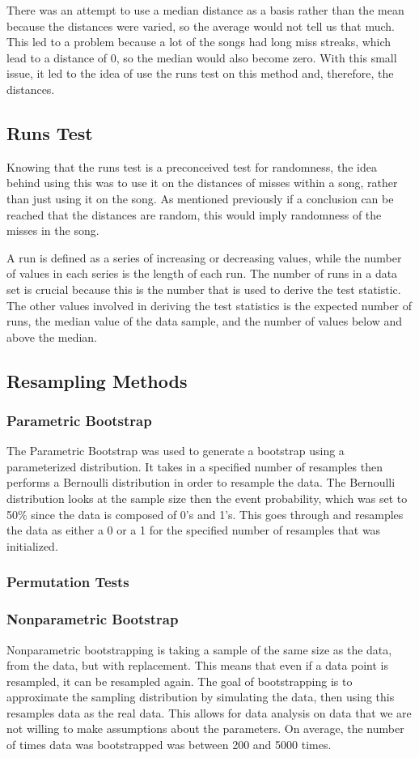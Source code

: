 \documentclass[12pt, letterpaper]{article}
\begin{document}
There was an attempt to use a median distance as a basis rather than the mean because the distances were varied, so the average would not tell us that much.  This led to a problem because a lot of the songs had long miss streaks, which lead to a distance of 0, so the median would also become zero.  With this small issue, it led to the idea of use the runs test on this method and, therefore, the distances.  

\subsection{Runs Test}
Knowing that the runs test is a preconceived test for randomness, the idea behind using this was to use it on the distances of misses within a song, rather than just using it on the song. As mentioned previously if a conclusion can be reached that the distances are random, this would imply randomness of the misses in the song. 

A run is defined as a series of increasing or decreasing values, while the number of values in each series is the length of each run. The number of runs in a data set is crucial because this is the number that is used to derive the test statistic. The other values involved in deriving the test statistics is the expected number of runs, the median value of the data sample, and the number of values below and above the median.

\subsection{Resampling Methods}
\subsubsection{Parametric Bootstrap}
The Parametric Bootstrap was used to generate a bootstrap using a parameterized distribution.  It takes in a specified number of resamples then performs a Bernoulli distribution in order to resample the data.  The Bernoulli distribution looks at the sample size then the event probability, which was set to 50\% since the data is composed of 0's and 1's.  This goes through and resamples the data as either a 0 or a 1 for the specified number of resamples that was initialized.   

\subsubsection{Permutation Tests}
\subsubsection{Nonparametric Bootstrap}
Nonparametric bootstrapping is taking a sample of the same size as the data, from the data, but with replacement. This means that even if a data point is resampled, it can be resampled again. The goal of bootstrapping is to approximate the sampling distribution by simulating the data, then using this resamples data as the real data. This allows for data analysis on data that we are not willing to make assumptions about the parameters. On average, the number of times data was bootstrapped was between 200 and 5000 times. 
\end{document}
